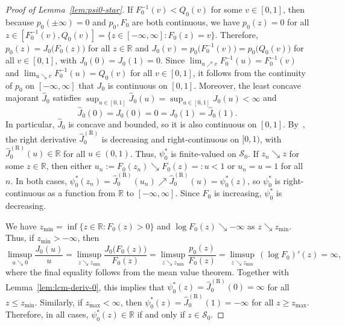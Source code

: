 \documentclass[a4paper]{article}
\newcommand{\R}{\mathbb{R}}
\theoremstyle{definition}
\begin{document}
\begin{proof}[Proof of Lemma~\ref{lem:psi0-star}]
If $F_0^{-1}(v) < Q_0(v)$ for some $v \in [0,1]$, then because $p_0(\pm\infty) = 0$ and $p_0,F_0$ are both continuous, we have $p_0(z) = 0$ for all $z \in [F_0^{-1}(v),Q_0(v)] = \{z \in [-\infty,\infty] : F_0(z) = v\}$. Therefore, $p_0(z) = J_0\bigl(F_0(z)\bigr)$ for all $z \in \R$ and $J_0(v) = p_0\bigl(F_0^{-1}(v)\bigr) = p_0\bigl(Q_0(v)\bigr)$ for all $v \in [0,1]$, with $J_0(0) = J_0(1) = 0$. Since $\lim_{u \nearrow v} F_0^{-1}(u) = F_0^{-1}(v)$ and $\lim_{u \searrow v} F_0^{-1}(u) = Q_0(v)$ for all $v \in [0,1]$, it follows from the continuity of $p_0$ on $[-\infty,\infty]$ that $J_0$ is continuous on $[0,1]$. Moreover, the least concave majorant $\hat{J}_0$ satisfies $\sup_{u \in [0,1]}\hat{J}_0(u) = \sup_{u \in [0,1]}J_0(u) < \infty$ and
\begin{equation}
\label{eq:J01}
\hat{J}_0(0) = J_0(0) = 0 = J_0(1) = \hat{J}_0(1).
\end{equation}
In particular, $\hat{J}_0$ is concave and bounded, so it is also continuous on $[0,1]$. By~\citet[Theorem~24.1]{rockafellar97convex}, the right derivative $\hat{J}_0^{(\mathrm{R})}$ is decreasing and right-continuous on $[0,1)$, with $\hat{J}_0^{(\mathrm{R})}(u) \in \R$ for all $u \in (0,1)$. Thus, $\psi_0^*$ is finite-valued on $\mathcal{S}_0$. If $z_n \searrow z$ for some $z \in \R$, then either $u_n := F_0(z_n) \searrow F_0(z) =:u < 1$ or $u_n = u = 1$ for all $n$. In both cases, $\psi_0^*(z_n) = \hat{J}_0^{(\mathrm{R})}(u_n) \nearrow \hat{J}_0^{(\mathrm{R})}(u) = \psi_0^*(z)$, so $\psi_0^*$ is right-continuous as a function from $\R$ to $[-\infty,\infty]$. Since $F_0$ is increasing, $\psi_0^*$ is decreasing.

We have $z_{\min} = \inf\{z \in \R : F_0(z) > 0\}$ and $\log F_0(z) \searrow -\infty$ as $z \searrow z_{\min}$. Thus, if $z_{\min} > -\infty$, then
\begin{equation}
\label{eq:left-hazard}
\limsup_{u \searrow 0}\frac{J_0(u)}{u} = \limsup_{z \searrow z_{\min}}\frac{J_0\bigl(F_0(z)\bigr)}{F_0(z)} = \limsup_{z \searrow z_{\min}}\frac{p_0(z)}{F_0(z)} = \limsup_{z \searrow z_{\min}}\,(\log F_0)'(z) = \infty,
\end{equation}
where the final equality follows from the mean value theorem. Together with Lemma~\ref{lem:lcm-deriv-0}, this implies that $\psi_0^*(z) = \hat{J}_0^{(\mathrm{R})}(0) = \infty$ for all $z \leq z_{\min}$. Similarly, if $z_{\max} < \infty$, then $\psi_0^*(z) = \hat{J}_0^{(\mathrm{R})}(1) = -\infty$ for all $z \geq z_{\max}$. Therefore, in all cases, $\psi_0^*(z) \in \R$ if and only if $z \in \mathcal{S}_0$.
\end{proof}
\end{document}
